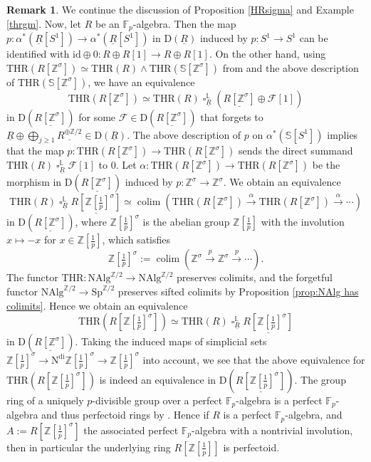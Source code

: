 \documentclass[10pt]{amsart}
\theoremstyle{definition}
\newtheorem{rmk}[thm]{Remark}
\numberwithin{equation}{section}
\newcommand{\F}{\mathbb{F}}
\renewcommand{\L}{\mathbb{L}}
\newcommand{\Sphere}{\mathbb{S}}
\newcommand{\Z}{\mathbb{Z}}
\newcommand{\cF}{\mathcal{F}}
\newcommand{\rD}{\mathrm{D}}
\newcommand{\ul}{\underline}
\newcommand{\NAlg}{\mathrm{NAlg}}
\newcommand{\Sp}{\mathrm{Sp}}
\newcommand{\id}{\mathrm{id}}
\newcommand{\colim}{\mathop{\mathrm{colim}}}
\DeclareMathOperator{\sotimes}{\square}
\newcommand{\THR}{\mathrm{THR}}
\newcommand{\Ndi}{\mathrm{N}^\mathrm{di}}
\begin{document}
\begin{rmk}
\label{perfectoid ring with nontrivial involution}
We continue the discussion of Proposition \ref{HRsigma} and Example \ref{thrgm}. Now, let $R$ be an $\F_p$-algebra.
Then the map $p\colon \alpha^*(\ul{R}[S^1])\to \alpha^*(\ul{R}[S^1])$ in $\rD(\ul{R})$ induced by $p\colon S^1\to S^1$ can be identified with $\id\oplus 0\colon R\oplus R[1]\to R\oplus R[1]$.
On the other hand,
using $\THR(R[\Z^\sigma])\simeq \THR(R)\wedge \THR(\Sphere[\Z^\sigma])$ from \cite[Proposition 2.1.5]{HP23} and the above description of $\THR(\Sphere[\Z^\sigma])$,
we have an equivalence
\[
\THR(R[\Z^\sigma])
\simeq
\THR(R)\sotimes_{\ul{R}}^\L (\ul{R[\Z^\sigma]}\oplus \cF[1])
\]
in $\rD(\ul{R[\Z^\sigma]})$ for some $\cF\in \rD(\ul{R[\Z^\sigma]})$ that forgets to $\ul{R}\oplus \bigoplus_{j\geq 1} \ul{R^{\oplus \Z/2}}\in \rD(\ul{R})$.
The above description of $p$ on $\alpha^*(\Sphere[S^1])$ implies that the map $p\colon \THR(R[\Z^\sigma])\to \THR(R[\Z^\sigma])$
sends the direct summand $\THR(R)\sotimes_{\ul{R}}^\L \cF[1]$ to $0$.
Let $\alpha\colon \THR(R[\Z^\sigma])\to \THR(R[\Z^\sigma])$ be the morphism in $\rD(\ul{R[\Z^\sigma]})$ induced by $p\colon \Z^\sigma\to \Z^\sigma$.
We obtain an equivalence
\[
\THR(R)\sotimes_{\ul{R}}^\L \ul{R[\Z[\tfrac{1}{p}]^\sigma]}
\simeq
\colim(\THR(R[\Z^\sigma]) \xrightarrow{\alpha} \THR(R[\Z^\sigma])\xrightarrow{\alpha}\cdots)
\]
in $\rD(\ul{R[\Z^\sigma]})$,
where $\Z[\tfrac{1}{p}]^\sigma$ is the abelian group $\Z[\tfrac{1}{p}]$ with the involution $x\mapsto -x$ for $x\in \Z[\tfrac{1}{p}]$,
which satisfies
\[
\Z[\tfrac{1}{p}]^\sigma
:=
\colim(\Z^\sigma \xrightarrow{p} \Z^\sigma\xrightarrow{p}\cdots).
\]
The functor $\THR\colon \NAlg^{\Z/2}\to \NAlg^{\Z/2}$ preserves colimits,
and the forgetful functor $\NAlg^{\Z/2}\to \Sp^{\Z/2}$ preserves sifted colimits by Proposition \ref{prop:NAlg has colimits}.
Hence we obtain an equivalence
\[
\THR(R[\Z[\tfrac{1}{p}]^\sigma])
\simeq
\THR(R)\sotimes_{\ul{R}}^\L \ul{R[\Z[\tfrac{1}{p}]^\sigma]}
\]
in $\rD(\ul{R[\Z^\sigma]})$.
Taking the induced maps of simplicial sets $\Z[\tfrac{1}{p}]^\sigma\to \Ndi \Z[\tfrac{1}{p}]^\sigma \to \Z[\tfrac{1}{p}]^\sigma$ into account,
we see that the above equivalence for $\THR(R[\Z[\tfrac{1}{p}]^\sigma])$ is indeed an equivalence in $\rD(\ul{R[\Z[\tfrac{1}{p}]^\sigma]})$.
The group ring of a uniquely $p$-divisible group over a perfect $\F_p$-algebra is a perfect $\F_p$-algebra and thus  perfectoid rings by \cite[Example 3.6]{BMS18}.
Hence if $R$ is a perfect $\F_p$-algebra, and $A:=R[\Z[\tfrac{1}{p}]^\sigma]$ the associated perfect $\F_p$-algebra with a nontrivial involution, then in particular the underlying ring $R[\Z[\tfrac{1}{p}]]$ is perfectoid.

\end{rmk}
\end{document}
